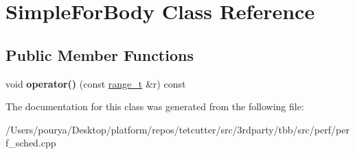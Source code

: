 \hypertarget{classSimpleForBody}{}\section{Simple\+For\+Body Class Reference}
\label{classSimpleForBody}
\subsection*{Public Member Functions}
\begin{DoxyCompactItemize}
\item 
\hypertarget{classSimpleForBody_a4264a835715868ee7450766ae0e52359}{}void {\bfseries operator()} (const \hyperlink{classtbb_1_1blocked__range}{range\+\_\+t} \&r) const \label{classSimpleForBody_a4264a835715868ee7450766ae0e52359}

\end{DoxyCompactItemize}


The documentation for this class was generated from the following file\+:\begin{DoxyCompactItemize}
\item 
/\+Users/pourya/\+Desktop/platform/repos/tetcutter/src/3rdparty/tbb/src/perf/perf\+\_\+sched.\+cpp\end{DoxyCompactItemize}
